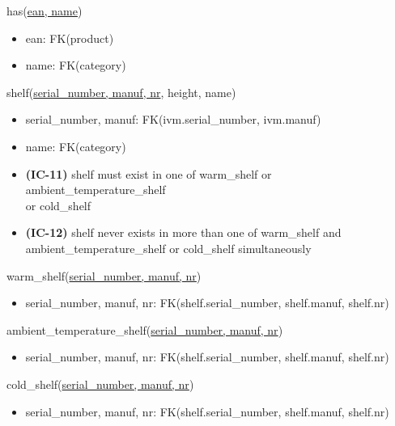 \documentclass[12pt,a4paper]{article}
\begin{document}
  \vspace*{10pt}

  \noindent
  has(\underline{ean, name})
  \begin{itemize}[nosep]
    \item ean: FK(product)
    \item name: FK(category)
  \end{itemize}


  \vspace*{10pt}

  \noindent
  shelf(\underline{serial\_number, manuf, nr}, height, name)
  \begin{itemize}[nosep]
    \item serial\_number, manuf: FK(ivm.serial\_number, ivm.manuf)
    \item name: FK(category)
    \item \textsf{\textbf{(IC-11)}} shelf \textsf{must exist in one of} warm\_shelf \textsf{or} ambient\_temperature\_shelf\\ \textsf{or} cold\_shelf
    \item \textsf{\textbf{(IC-12)}} shelf \textsf{never exists in more than one of} warm\_shelf \textsf{and}\\ ambient\_temperature\_shelf \textsf{or} cold\_shelf \textsf{simultaneously}
  \end{itemize}

  \vspace*{10pt}

  \noindent
  warm\_shelf(\underline{serial\_number, manuf, nr})
  \begin{itemize}[nosep]
    \item serial\_number, manuf, nr: FK(shelf.serial\_number, shelf.manuf, shelf.nr)
  \end{itemize}

  \vspace*{10pt}

  \noindent
  ambient\_temperature\_shelf(\underline{serial\_number, manuf, nr})
  \begin{itemize}[nosep]
    \item serial\_number, manuf, nr: FK(shelf.serial\_number, shelf.manuf, shelf.nr)
  \end{itemize}

  \vspace*{10pt}

  \noindent
  cold\_shelf(\underline{serial\_number, manuf, nr})
  \begin{itemize}[nosep]
    \item serial\_number, manuf, nr: FK(shelf.serial\_number, shelf.manuf, shelf.nr)
  \end{itemize}
\end{document}
